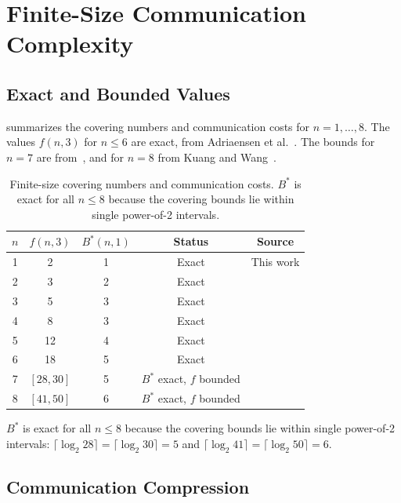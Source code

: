 \documentclass[11pt,letterpaper]{article}
\newcommand{\Bstar}{B^{\!*}}
\begin{document}
\section{Finite-Size Communication Complexity}
\label{sec:finite}

\subsection{Exact and Bounded Values}

 summarizes the covering numbers and communication costs for $n = 1, \ldots, 8$. The values $f(n,3)$ for $n \leq 6$ are exact, from Adriaensen et al.~\cite{adriaensen2026}. The bounds for $n=7$ are from~\cite{adriaensen2026}, and for $n=8$ from Kuang and Wang~\cite{kuangwang2026}.

\begin{table}[ht]
\centering
\caption{Finite-size covering numbers and communication costs. $B^*$ is exact for all $n \leq 8$ because the covering bounds lie within single power-of-2 intervals.}
\label{tab:finite}
\begin{tabular}{ccccc}
\toprule
$n$ & $f(n,3)$ & $\Bstar(n,1)$ & Status & Source \\
\midrule
1 & 2 & 1 & Exact & This work \\
2 & 3 & 2 & Exact & \cite{adriaensen2026} \\
3 & 5 & 3 & Exact & \cite{adriaensen2026} \\
4 & 8 & 3 & Exact & \cite{adriaensen2026} \\
5 & 12 & 4 & Exact & \cite{adriaensen2026} \\
6 & 18 & 5 & Exact & \cite{adriaensen2026} \\
7 & $[28, 30]$ & 5 & $B^*$ exact, $f$ bounded & \cite{adriaensen2026} \\
8 & $[41, 50]$ & 6 & $B^*$ exact, $f$ bounded & \cite{kuangwang2026} \\
\bottomrule
\end{tabular}
\end{table}

$\Bstar$ is exact for all $n \leq 8$ because the covering bounds lie within single power-of-2 intervals: $\lceil \log_2 28 \rceil = \lceil \log_2 30 \rceil = 5$ and $\lceil \log_2 41 \rceil = \lceil \log_2 50 \rceil = 6$.

\subsection{Communication Compression}
\end{document}
